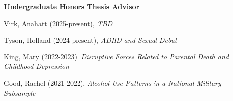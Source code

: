 \begin{comment}
\item Lacey, Conor (Oct 2022), \textit{Effect Sizes for Measurement Non-Invariance: A Review}.  Wake Forest%
\item Hwang, Yoo Ri$\dagger$ (Oct 2021), \textit{The SES-health Gradient: Comparing Two Approaches}. Wake Forest%
\item Yi, Ye Dam (Oct 2020), \textit{Feeling for Another: The Role of Emotions on Self-Other Differences in Risk-Involving Decisions}. Wake Forest%
\item Slipetz, Lindley (Sep 2020), \textit{The Structure of Depression Symptomatology: A Comparison of Factor and Network Analyses}. Wake Forest%
\item Demaske, Alana (Oct 2019), \textit{Examining the construct validity and functional utility of personal growth initiative in a war-affected Sri Lankan sample}. Wake Forest%
\end{etaremune}%
\end{comment}
{\large\textbf{Undergraduate Honors Thesis Advisor}}
\begin{etaremune}%
\item Virk, Anahatt (2025-present), \textit{TBD}
\item Tyson, Holland (2024-present), \textit{ADHD and Sexual Debut}
\item King, Mary (2022-2023), \textit{Disruptive Forces Related to Parental Death and Childhood Depression} %
\item Good, Rachel (2021-2022), \textit{Alcohol Use Patterns in a National Military Subsample} %
\end{etaremune}%

